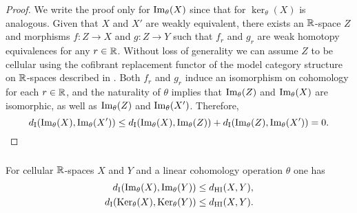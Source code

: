 \begin{proof}
	We write the proof only for $\operatorname{Im}_\theta(X)$ since that for $\ker_\theta(X)$ is analogous.
	Given that $X$ and $X'$ are weakly equivalent, there exists an $\mathbb{R}$-space $Z$ and morphisms $f \colon Z \to X$ and $g \colon Z \to Y$ such that $f_r$ and $g_r$ are weak homotopy equivalences for any $r \in \mathbb{R}$.
	Without loss of generality we can assume $Z$ to be cellular using the cofibrant replacement functor of the model category structure on $\mathbb{R}$-spaces described in \cite{blumberg2023interleaving}.
	Both $f_r$ and $g_r$ induce an isomorphism on cohomology for each $r \in \mathbb{R}$, and the naturality of $\theta$ implies that $\operatorname{Im}_\theta(Z)$ and $\operatorname{Im}_\theta(X)$ are isomorphic, as well as $\operatorname{Im}_\theta(Z)$ and $\operatorname{Im}_\theta(X')$.
	Therefore,
	\[
	d_{\mathrm{I}}(\operatorname{Im}_\theta(X),\operatorname{Im}_\theta(X')) \leq
	d_{\mathrm{I}}(\operatorname{Im}_\theta(X),\operatorname{Im}_\theta(Z)) + d_{\mathrm{I}}(\operatorname{Im}_\theta(Z),\operatorname{Im}_\theta(X')) =
	0.\qedhere
	\]
\end{proof}

\subsubsection{}\label{thm:theta stability}

\lemma
For cellular $\mathbb{R}$-spaces $X$ and $Y$ and a linear cohomology operation $\theta$ one has
\begin{align*}
	d_{\mathrm{I}}(\operatorname{Im}_\theta(X), \operatorname{Im}_\theta(Y)) &\leq d_{\mathrm{HI}}(X,Y), \\
	d_{\mathrm{I}}(\operatorname{Ker}_\theta(X), \operatorname{Ker}_\theta(Y)) &\leq d_{\mathrm{HI}}(X,Y).
\end{align*}

